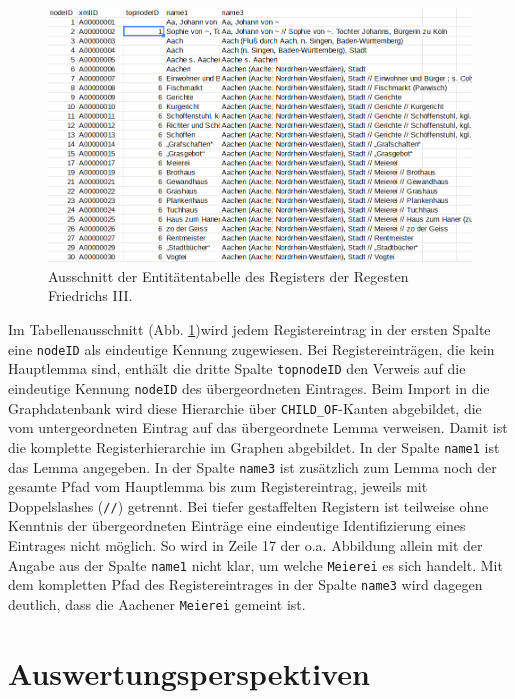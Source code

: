 \documentclass[ngerman,]{scrreprt}
\begin{document}
\begin{figure}
\centering
\includegraphics{Bilder/RI2Graph/RegisterF3-Hierarchie.png}
\caption{Ausschnitt der Entitätentabelle des Registers der Regesten Friedrichs III.}
\label{entitaetenaachen}
\end{figure}

Im Tabellenausschnitt (Abb. \ref{entitaetenaachen})wird jedem Registereintrag in der ersten Spalte eine \texttt{nodeID} als eindeutige Kennung zugewiesen. Bei Registereinträgen, die kein Hauptlemma sind, enthält die dritte Spalte \texttt{topnodeID} den Verweis auf die eindeutige Kennung \texttt{nodeID} des übergeordneten Eintrages. Beim Import in die Graphdatenbank wird diese Hierarchie über \texttt{CHILD\_OF}-Kanten abgebildet, die vom untergeordneten Eintrag auf das übergeordnete Lemma verweisen. Damit ist die komplette Registerhierarchie im Graphen abgebildet. In der Spalte \texttt{name1} ist das Lemma angegeben. In der Spalte \texttt{name3} ist zusätzlich zum Lemma noch der gesamte Pfad vom Hauptlemma bis zum Registereintrag, jeweils mit Doppelslashes (\texttt{//}) getrennt. Bei tiefer gestaffelten Registern ist teilweise ohne Kenntnis der übergeordneten Einträge eine eindeutige Identifizierung eines Eintrages nicht möglich. So wird in Zeile 17 der o.a. Abbildung allein mit der Angabe aus der Spalte \texttt{name1} nicht klar, um welche \texttt{Meierei} es sich handelt. Mit dem kompletten Pfad des Registereintrages in der Spalte \texttt{name3} wird dagegen deutlich, dass die Aachener \texttt{Meierei} gemeint ist.

\hypertarget{auswertungsperspektiven}{%
\section{Auswertungsperspektiven}\label{auswertungsperspektiven}}
\end{document}

